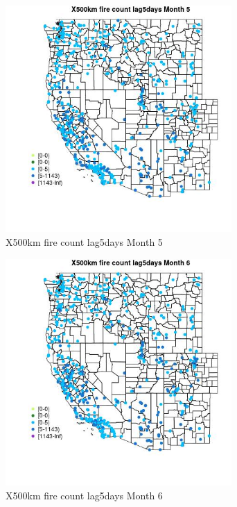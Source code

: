 \begin{figure} 
\centering  
\includegraphics[width=0.77\textwidth]{Code_Outputs/Report_ML_input_PM25_Step4_part_e_de_duplicated_aves_compiled_2019-05-14wNAs_MapObsMo5X500km_fire_count_lag5days.jpg} 
\caption{\label{fig:Report_ML_input_PM25_Step4_part_e_de_duplicated_aves_compiled_2019-05-14wNAsMapObsMo5X500km_fire_count_lag5days}X500km fire count lag5days Month 5} 
\end{figure} 
 

\begin{figure} 
\centering  
\includegraphics[width=0.77\textwidth]{Code_Outputs/Report_ML_input_PM25_Step4_part_e_de_duplicated_aves_compiled_2019-05-14wNAs_MapObsMo6X500km_fire_count_lag5days.jpg} 
\caption{\label{fig:Report_ML_input_PM25_Step4_part_e_de_duplicated_aves_compiled_2019-05-14wNAsMapObsMo6X500km_fire_count_lag5days}X500km fire count lag5days Month 6} 
\end{figure} 
 

